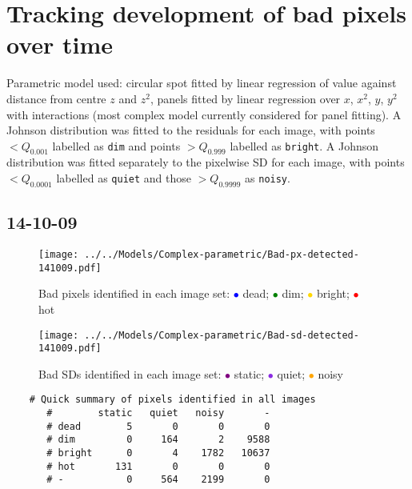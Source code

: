 \documentclass[10pt,fleqn]{article}
\begin{document}
\newpage
\section*{Tracking development of bad pixels over time}

Parametric model used: circular spot fitted by linear regression of value against distance from centre $z$ and $z^2$, panels fitted by linear regression over $x$, $x^2$, $y$, $y^2$ with interactions (most complex model currently considered for panel fitting). A Johnson distribution was fitted to the residuals for each image, with points $< Q_{0.001}$ labelled as \texttt{dim} and points $> Q_{0.999}$ labelled as \texttt{bright}. A Johnson distribution was fitted separately to the pixelwise SD for each image, with points $< Q_{0.0001}$ labelled as \texttt{quiet} and those $> Q_{0.9999}$ as \texttt{noisy}.

\subsection*{14-10-09}

\begin{figure}[!h]
\caption{Bad pixels identified in each image set: 
\textcolor{blue}{$\bullet$} dead; \textcolor{green}{$\bullet$} dim;  \textcolor{gold}{$\bullet$} bright; \textcolor{red}{$\bullet$} hot}
\texttt{[image: ../../Models/Complex-parametric/Bad-px-detected-141009.pdf]}
\end{figure}


\begin{figure}[!h]
\caption{Bad SDs identified in each image set: 
\textcolor{purple}{$\bullet$} static; \textcolor{BlueViolet}{$\bullet$} quiet;  \textcolor{orange}{$\bullet$} noisy}
\texttt{[image: ../../Models/Complex-parametric/Bad-sd-detected-141009.pdf]}
\end{figure}

\begin{footnotesize}
\begin{verbatim}
	# Quick summary of pixels identified in all images
       #        static   quiet   noisy       -
       # dead        5       0       0       0
       # dim         0     164       2    9588
       # bright      0       4    1782   10637
       # hot       131       0       0       0
       # -           0     564    2199       0
\end{verbatim}
\end{footnotesize}
\end{document}
